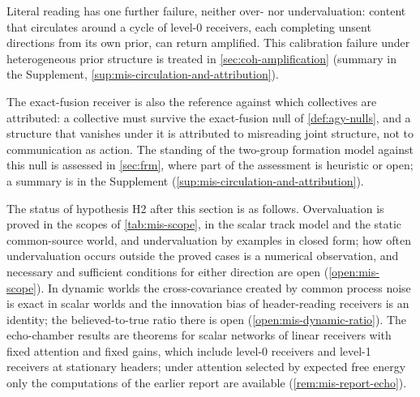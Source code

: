 Literal reading has one further failure, neither over- nor undervaluation: content that circulates around a cycle of level-0 receivers, each completing unsent directions from its own prior, can return amplified. This calibration failure under heterogeneous prior structure is treated in \cref{sec:coh-amplification} (summary in the Supplement, \cref{sup:mis-circulation-and-attribution}).

The exact-fusion receiver is also the reference against which collectives are attributed: a collective must survive the exact-fusion null of \cref{def:agy-nulls}, and a structure that vanishes under it is attributed to misreading joint structure, not to communication as action. The standing of the two-group formation model against this null is assessed in \cref{sec:frm}, where part of the assessment is heuristic or open; a summary is in the Supplement (\cref{sup:mis-circulation-and-attribution}).

The status of hypothesis H2 after this section is as follows. Overvaluation is proved in the scopes of \cref{tab:mis-scope}, in the scalar track model and the static common-source world, and undervaluation by examples in closed form; how often undervaluation occurs outside the proved cases is a numerical observation, and necessary and sufficient conditions for either direction are open (\cref{open:mis-scope}). In dynamic worlds the cross-covariance created by common process noise is exact in scalar worlds and the innovation bias of header-reading receivers is an identity; the believed-to-true ratio there is open (\cref{open:mis-dynamic-ratio}). The echo-chamber results are theorems for scalar networks of linear receivers with fixed attention and fixed gains, which include level-0 receivers and level-1 receivers at stationary headers; under attention selected by expected free energy only the computations of the earlier report are available (\cref{rem:mis-report-echo}).
